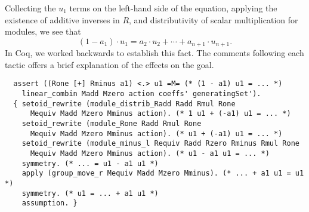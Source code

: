 \documentclass{article}
\begin{document}
Collecting the \(u_{1}\) terms on the left-hand side of the equation, applying
the existence of additive inverses in $R$, and distributivity of scalar
multiplication for modules, we see that
\begin{equation}\label{equation1: e}
(1 - a_{1}) \cdot u_{1} =
  a_{2} \cdot u_{2} + \cdots + a_{n+1} \cdot u_{n+1}\text{.}
\end{equation}
In Coq, we worked backwards to establish this fact. The comments following
each tactic offers a brief explanation of the effects on the goal.
\begin{verbatim}
  assert ((Rone [+] Rminus a1) <.> u1 =M= (* (1 - a1) u1 = ... *)
    linear_combin Madd Mzero action coeffs' generatingSet').
  { setoid_rewrite (module_distrib_Radd Radd Rmul Rone
      Mequiv Madd Mzero Mminus action). (* 1 u1 + (-a1) u1 = ... *)
    setoid_rewrite (module_Rone Radd Rmul Rone
      Mequiv Madd Mzero Mminus action). (* u1 + (-a1) u1 = ... *)
    setoid_rewrite (module_minus_l Requiv Radd Rzero Rminus Rmul Rone
      Mequiv Madd Mzero Mminus action). (* u1 - a1 u1 = ... *)
    symmetry. (* ... = u1 - a1 u1 *)
    apply (group_move_r Mequiv Madd Mzero Mminus). (* ... + a1 u1 = u1 *)
    symmetry. (* u1 = ... + a1 u1 *)
    assumption. }
\end{verbatim}
\end{document}
